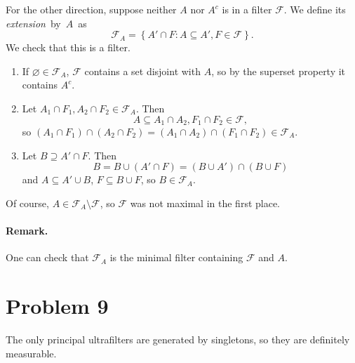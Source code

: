 For the other direction, suppose neither \( A \) nor \( A^c \) is in a filter \( \mathcal{F} \). We define its \emph{extension}~by~\( A \)~as
\[ 
    \mathcal{F}_A = \left\{ A' \cap F : A \subseteq A', F \in \mathcal{F} \right\}.
\]
We check that this is a filter.
\begin{enumerate}
    \item If \( \varnothing \in \mathcal{F}_A \), \( \mathcal{F} \) contains a set disjoint with \( A \), so by the superset property it contains \( A^c \).
    \item Let \( A_1 \cap F_1, A_2 \cap F_2 \in \mathcal{F}_A \). Then
    \[ 
    A \subseteq A_1 \cap A_2, F_1 \cap F_2 \in \mathcal{F},
   \]
   so \( (A_1 \cap F_1) \cap (A_2 \cap F_2) = (A_1 \cap A_2) \cap (F_1 \cap F_2) \in \mathcal{F}_A \).
\item Let \( B \supseteq A' \cap F \). Then
    \[ 
       B = B \cup (A' \cap F) = (B \cup A') \cap (B \cup F)
   \]
   and \( A \subseteq A' \cup B \), \( F \subseteq B \cup F \), so \( B \in \mathcal{F}_A \).
\end{enumerate}
Of course, \( A \in \mathcal{F}_A \setminus \mathcal{F} \), so \( \mathcal{F} \) was not maximal in the first place.

\paragraph{Remark.} One can check that \( \mathcal{F}_A \) is the minimal filter containing \( \mathcal{F} \) and \( A \).

\section*{Problem 9}

The only principal ultrafilters are generated by singletons, so they are definitely measurable.
